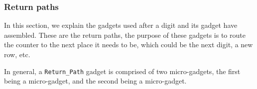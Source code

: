

\subsubsection{ Return paths}
In this section, we explain the gadgets used after a digit and its {\dtop} gadget have assembled. These
are the return paths, the purpose of these gadgets is to route the counter to the next place it needs to be, which
could be the next digit, a new row, etc.

In general, a {\tt Return\_Path} gadget is comprised of two micro-gadgets, the first being a {\returnfromdigit} micro-gadget, and
the second being a {\readnext} micro-gadget.


\begin{figure}[H]
    \centering
    \begin{subfigure}[t]{0.32\textwidth}
        \centering

\end{subfigure}
\end{figure}
